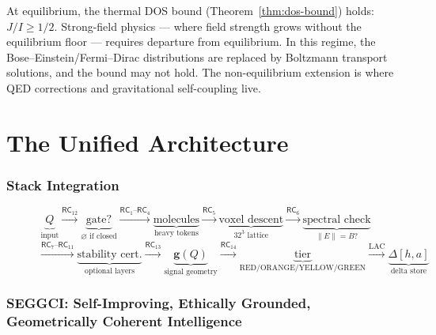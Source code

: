 \documentclass[11pt,twoside]{article}
\theoremstyle{plain}
\theoremstyle{definition}
\theoremstyle{remark}
\newcommand{\RC}[1]{\textsf{RC}_{#1}}
\begin{document}
At equilibrium, the thermal DOS bound (Theorem~\ref{thm:dos-bound}) holds:
$J/I\ge 1/2$.  Strong-field physics --- where field strength grows without the
equilibrium floor --- requires departure from equilibrium.  In this regime,
the Bose--Einstein/Fermi--Dirac distributions are replaced by Boltzmann
transport solutions, and the bound may not hold.  The non-equilibrium
extension is where QED corrections and gravitational self-coupling live.

\part{The Unified Architecture}

\section{Stack Integration}

\begin{figure}[h!]
\centering
\begin{tcolorbox}[rcbox, title=Full Stack Signal Flow, width=\linewidth]
\small
\begin{equation*}
\underbrace{Q}_{\text{input}}
\xrightarrow{\RC{12}}
\underbrace{\text{gate?}}_{\varnothing \text{ if closed}}
\xrightarrow{\RC{1}\text{--}\RC{4}}
\underbrace{\text{molecules}}_{\text{heavy tokens}}
\xrightarrow{\RC{5}}
\underbrace{\text{voxel descent}}_{\text{32}^3\text{ lattice}}
\xrightarrow{\RC{6}}
\underbrace{\text{spectral check}}_{\|E\|=B?}
\end{equation*}
\begin{equation*}
\xrightarrow{\RC{7}\text{--}\RC{11}}
\underbrace{\text{stability cert.}}_{\text{optional layers}}
\xrightarrow{\RC{13}}
\underbrace{\mathbf{g}(Q)}_{\text{signal geometry}}
\xrightarrow{\RC{14}}
\underbrace{\text{tier}}_{\text{RED/ORANGE/YELLOW/GREEN}}
\xrightarrow{\text{LAC}}
\underbrace{\Delta[h,a]}_{\text{delta store}}
\end{equation*}
\end{tcolorbox}
\end{figure}

\section{SEGGCI: Self-Improving, Ethically Grounded, Geometrically Coherent Intelligence}
\end{document}

